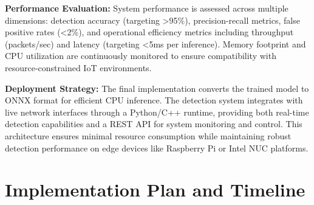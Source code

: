\documentclass[12pt]{article}
\begin{document}
\textbf{Performance Evaluation:} System performance is assessed across multiple dimensions: detection accuracy (targeting >95\%), precision-recall metrics, false positive rates (<2\%), and operational efficiency metrics including throughput (packets/sec) and latency (targeting <5ms per inference). Memory footprint and CPU utilization are continuously monitored to ensure compatibility with resource-constrained IoT environments.

\textbf{Deployment Strategy:} The final implementation converts the trained model to ONNX format for efficient CPU inference. The detection system integrates with live network interfaces through a Python/C++ runtime, providing both real-time detection capabilities and a REST API for system monitoring and control. This architecture ensures minimal resource consumption while maintaining robust detection performance on edge devices like Raspberry Pi or Intel NUC platforms.


\section{Implementation Plan and Timeline}
\end{document}

